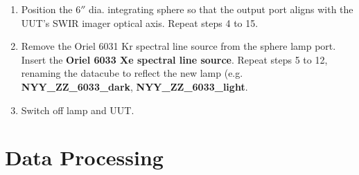 \documentclass[nohyper,nobib]{tufte-book}
\begin{document}
\begin{enumerate}
	\item Position the 6$''$ dia. integrating sphere so that the output port aligns with the UUT's SWIR imager optical axis. Repeat steps 4 to 15.
	\item Remove the Oriel 6031 Kr spectral line source from the sphere lamp port. Insert the \textbf{Oriel 6033 Xe spectral line source}.  Repeat steps  5 to 12, renaming the datacube to reflect the new lamp (e.g.   \textbf{NYY\_ZZ\_6033\_dark},  \textbf{NYY\_ZZ\_6033\_light}.
	\item Switch off lamp and UUT. 
\end{enumerate}

\section{Data Processing}
\end{document}
